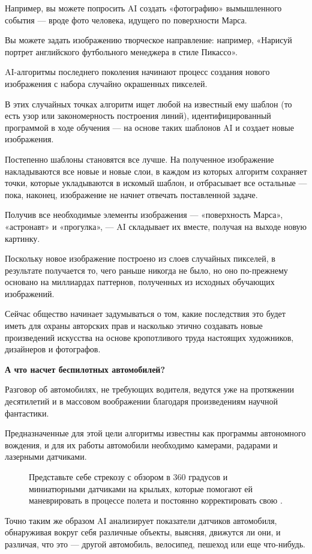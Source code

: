 Например, вы можете попросить AI создать «фотографию» вымышленного события — вроде фото человека, идущего по поверхности Марса.

Вы можете задать изображению творческое направление: например, «Нарисуй портрет английского футбольного менеджера в стиле Пикассо».

AI-алгоритмы последнего поколения начинают процесс создания нового изображения с набора случайно окрашенных пикселей.

В этих случайных точках алгоритм ищет любой  на известный ему шаблон (то есть узор или закономерность построения линий), идентифицированный программой в ходе обучения — на основе таких шаблонов AI и создает новые изображения.

Постепенно шаблоны становятся все лучше. На полученное изображение накладываются все новые и новые слои, в каждом из которых алгоритм сохраняет точки, которые укладываются в искомый шаблон, и отбрасывает все остальные — пока, наконец, изображение не начнет отвечать поставленной задаче.

Получив все необходимые элементы изображения — «поверхность Марса», «астронавт» и «прогулка», — AI складывает их вместе, получая на выходе новую картинку.

Поскольку новое изображение построено из слоев случайных пикселей, в результате получается то, чего раньше никогда не было, но оно по-прежнему основано на миллиардах паттернов, полученных из исходных обучающих изображений.

Сейчас общество начинает задумываться о том, какие последствия это будет иметь для охраны авторских прав и насколько этично создавать новые произведений искусства на основе кропотливого труда настоящих художников, дизайнеров и фотографов.


\textbf{А что насчет беспилотных автомобилей?}

Разговор об автомобилях, не требующих водителя, ведутся уже на протяжении десятилетий и   в массовом воображении благодаря произведениям научной фантастики.

Предназначенные для этой цели алгоритмы известны как программы автономного вождения, и для их работы автомобили необходимо  камерами, радарами и лазерными датчиками.

\begin{figure}
    \begin{fancyquotes}
        Представьте себе стрекозу с обзором в 360 градусов и миниатюрными датчиками на крыльях, которые помогают ей маневрировать в процессе полета и постоянно корректировать свою .
    \end{fancyquotes}
\end{figure}
Точно таким же образом AI анализирует показатели датчиков автомобиля, обнаруживая вокруг себя различные объекты, выясняя, движутся ли они, и различая, что это — другой автомобиль, велосипед, пешеход или еще что-нибудь.

